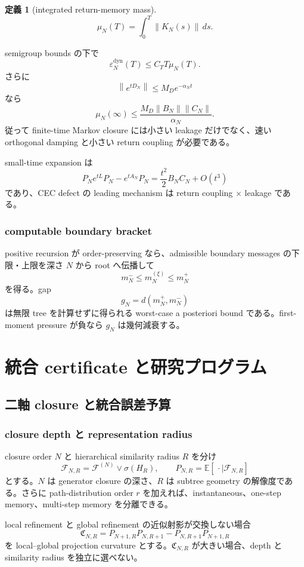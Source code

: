 \documentclass[11pt,a4paper,openany]{book}
\newtheorem{definition}{定義}[chapter]
\numberwithin{equation}{chapter}
\newcommand{\E}{\mathbb E}
\newcommand{\cF}{\mathcal F}
\newcommand{\norm}[1]{\left\lVert #1\right\rVert}
\begin{document}
\begin{definition}[integrated return-memory mass]
\[
\mu_N(T)=\int_0^T\norm{K_N(s)}\,ds.
\]
\end{definition}

semigroup bounds の下で
\[
\varepsilon_N^{\mathrm{dyn}}(T)
\le C_TT\mu_N(T).
\]
さらに
\[
\norm{e^{tD_N}}\le M_De^{-\alpha_Nt}
\]
なら
\[
\mu_N(\infty)
\le\frac{M_D\norm{B_N}\norm{C_N}}{\alpha_N}.
\]
従って finite-time Markov closure には小さい leakage だけでなく、速い orthogonal damping と小さい return coupling が必要である。

small-time expansion は
\[
P_Ne^{tL}P_N-e^{tA_N}P_N
=\frac{t^2}{2}B_NC_N+O(t^3)
\]
であり、CEC defect の leading mechanism は return coupling $\times$ leakage である。

\section{computable boundary bracket}
positive recursion が order-preserving なら、admissible boundary messages の下限・上限を深さ $N$ から root へ伝播して
\[
m_N^-\le m_N^{(\xi)}\le m_N^+
\]
を得る。gap
\[
g_N=d(m_N^+,m_N^-)
\]
は無限 tree を計算せずに得られる worst-case a posteriori bound である。first-moment pressure が負なら $g_N$ は幾何減衰する。

\part{統合 certificate と研究プログラム}

\chapter{二軸 closure と統合誤差予算}
\section{closure depth と representation radius}
closure order $N$ と hierarchical similarity radius $R$ を分け
\[
\cF_{N,R}=\cF^{(N)}\vee\sigma(H_R),
\qquad
P_{N,R}=\E[\,\cdot\mid\cF_{N,R}]
\]
とする。$N$ は generator closure の深さ、$R$ は subtree geometry の解像度である。さらに path-distribution order $r$ を加えれば、instantaneous、one-step memory、multi-step memory を分離できる。

local refinement と global refinement の近似射影が交換しない場合
\[
\mathfrak C_{N,R}
=P_{N+1,R}P_{N,R+1}-P_{N,R+1}P_{N+1,R}
\]
を local--global projection curvature とする。$\mathfrak C_{N,R}$ が大きい場合、depth と similarity radius を独立に選べない。
\end{document}
